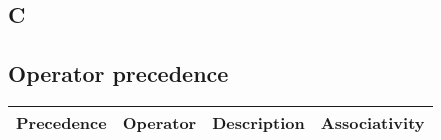 \documentclass{extarticle}
\begin{document}
 
\begin{multicols}{2}




\setcounter{secnumdepth}{0}

\section{C}

\subsection{Operator precedence}

\begin{tabular}{|l|l|l|l|}
\hline
Precedence     & Operator                                              & Description                                                            & Associativity \\ \hline
\end{tabular}



\end{multicols}
\end{document}
